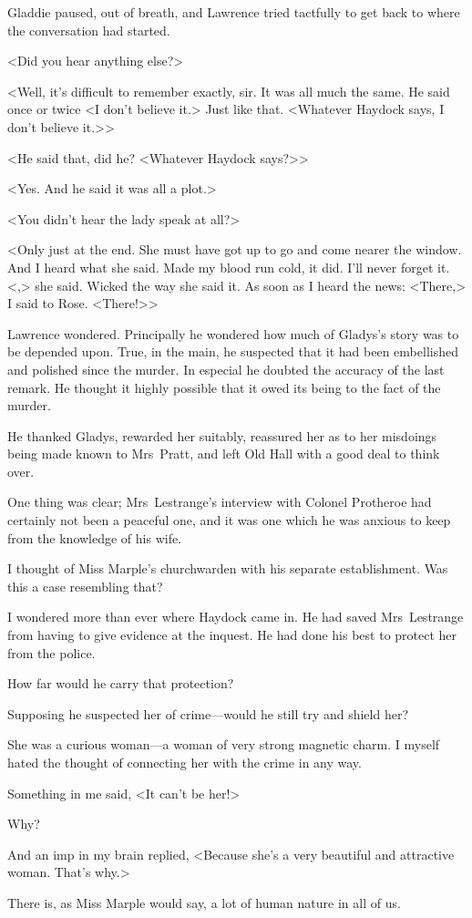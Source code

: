 Gladdie paused, out of breath, and Lawrence tried tactfully to get back to where the conversation had started.

<Did you hear anything else?>

<Well, it's difficult to remember exactly, sir. It was all much the same. He said once or twice <I don't believe it.> Just like that. <Whatever Haydock says, I don't believe it.>>

<He said that, did he? <Whatever Haydock says?>>

<Yes. And he said it was all a plot.>

<You didn't hear the lady speak at all?>

<Only just at the end. She must have got up to go and come nearer the window. And I heard what she said. Made my blood run cold, it did. I'll never forget it. <,> she said. Wicked the way she said it. As soon as I heard the news: <There,> I said to Rose. <There!>>

Lawrence wondered. Principally he wondered how much of Gladys's story was to be depended upon. True, in the main, he suspected that it had been embellished and polished since the murder. In especial he doubted the accuracy of the last remark. He thought it highly possible that it owed its being to the fact of the murder.

He thanked Gladys, rewarded her suitably, reassured her as to her misdoings being made known to Mrs~Pratt, and left Old Hall with a good deal to think over.

One thing was clear; Mrs~Lestrange's interview with Colonel Protheroe had certainly not been a peaceful one, and it was one which he was anxious to keep from the knowledge of his wife.

I thought of Miss Marple's churchwarden with his separate establishment. Was this a case resembling that?

I wondered more than ever where Haydock came in. He had saved Mrs~Lestrange from having to give evidence at the inquest. He had done his best to protect her from the police.

How far would he carry that protection?

Supposing he suspected her of crime—would he still try and shield her?

She was a curious woman—a woman of very strong magnetic charm. I myself hated the thought of connecting her with the crime in any way.

Something in me said, <It can't be her!>

Why?

And an imp in my brain replied, <Because she's a very beautiful and attractive woman. That's why.>

There is, as Miss Marple would say, a lot of human nature in all of us.
